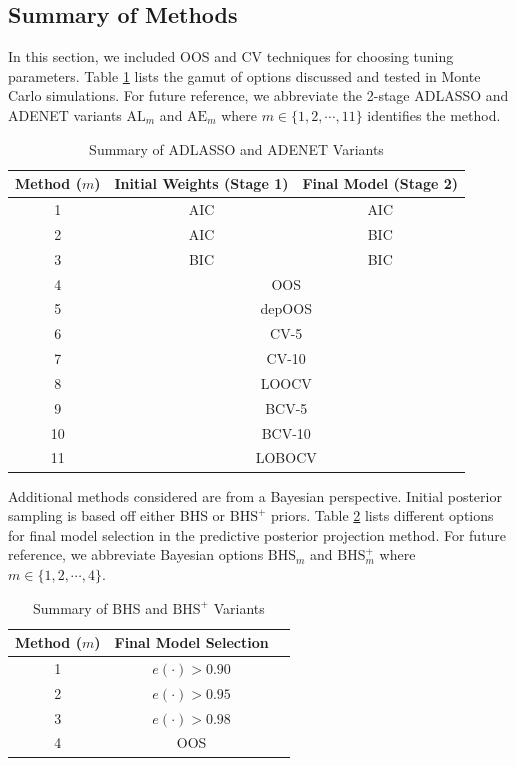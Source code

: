 \subsection{Summary of Methods}

In this section, we included OOS and CV techniques for choosing tuning parameters. Table \ref{tab:aicbic} lists the gamut of options discussed and tested in Monte Carlo simulations. For future reference, we abbreviate the 2-stage ADLASSO and ADENET variants $\textrm{AL}_m$ and $\textrm{AE}_m$ where $m \in \{1,2,\cdots,11\}$ identifies the method. 

\begin{table}[!h]
  \footnotesize
  \centering
  \caption{Summary of ADLASSO and ADENET Variants}
    \begin{tabular}{c|cc}
    \toprule
    Method ($m$) & Initial Weights (Stage 1) & Final Model (Stage 2)  \\
    \midrule
    1 & AIC & AIC\\
    2 & AIC & BIC \\
    3 & BIC & BIC \\
    \midrule
    4 & \multicolumn{2}{c}{OOS} \\
    5 & \multicolumn{2}{c}{depOOS} \\
    \midrule
    6 & \multicolumn{2}{c}{CV-5} \\
    7 & \multicolumn{2}{c}{CV-10} \\
    8 & \multicolumn{2}{c}{LOOCV} \\
    \midrule
    9 & \multicolumn{2}{c}{BCV-5} \\
    10 & \multicolumn{2}{c}{BCV-10} \\
    11 & \multicolumn{2}{c}{LOBOCV} \\
    \bottomrule
    \end{tabular}%
  \label{tab:aicbic}%
\end{table}%

Additional methods considered are from a Bayesian perspective. Initial posterior sampling is based off either BHS or $\textrm{BHS}^+$ priors. Table \ref{tab:bhstypes} lists different options for final model selection in the predictive posterior projection method. For future reference, we abbreviate Bayesian options $\textrm{BHS}_m$ and $\textrm{BHS}^+_m$ where $m \in \{1,2,\cdots,4\}$. 

\begin{table}[!h]
  \footnotesize
  \centering
  \caption{Summary of BHS and $\textrm{BHS}^+$ Variants }
    \begin{tabular}{c|cc}
    \toprule
    Method ($m$) & Final Model Selection  \\
    \midrule
    1 & $e(\cdot)>0.90$ \\
    2 & $e(\cdot)>0.95$ \\
    3 & $e(\cdot)>0.98$\\
    \midrule
    4 & OOS\\
    \bottomrule
    \end{tabular}%
  \label{tab:bhstypes}%
\end{table}%







